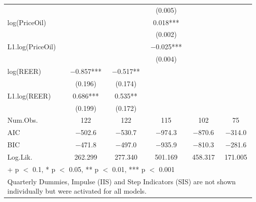 \begin{table}
{\begin{tabular}[t]{lccccc}
 &  &  & (\num{0.005}) &  & \\
log(PriceOil) &  &  & \num{0.018}*** &  & \\
 &  &  & (\num{0.002}) &  & \\
L1.log(PriceOil) &  &  & \num{-0.025}*** &  & \\
 &  &  & (\num{0.004}) &  & \\
log(REER) & \num{-0.857}*** & \num{-0.517}** &  &  & \\
 & (\num{0.196}) & (\num{0.174}) &  &  & \\
L1.log(REER) & \num{0.686}*** & \num{0.535}** &  &  & \\
 & (\num{0.199}) & (\num{0.172}) &  &  & \\
\midrule
Num.Obs. & \num{122} & \num{122} & \num{115} & \num{102} & \num{75}\\
AIC & \num{-502.6} & \num{-530.7} & \num{-974.3} & \num{-870.6} & \num{-314.0}\\
BIC & \num{-471.8} & \num{-497.0} & \num{-935.9} & \num{-810.3} & \num{-281.6}\\
Log.Lik. & \num{262.299} & \num{277.340} & \num{501.169} & \num{458.317} & \num{171.005}\\
\bottomrule
\multicolumn{6}{l}{\rule{0pt}{1em}+ p $<$ 0.1, * p $<$ 0.05, ** p $<$ 0.01, *** p $<$ 0.001}\\
\multicolumn{6}{l}{\rule{0pt}{1em}Quarterly Dummies, Impulse (IIS) and Step Indicators (SIS) are not shown individually but were activated for all models.}\\
\end{tabular}}
\end{table}
